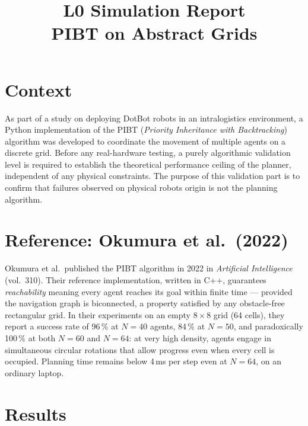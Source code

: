 \documentclass[12pt,a4paper]{article}
\title{\textbf{L0 Simulation Report}\\
\large PIBT on Abstract Grids}
\author{}
\date{}
\begin{document}
\maketitle

\section{Context}

As part of a study on deploying DotBot robots in an intralogistics environment,
a Python implementation of the PIBT (\textit{Priority Inheritance with Backtracking})
algorithm was developed to coordinate the movement of multiple agents on a discrete grid.
Before any real-hardware testing, a purely algorithmic validation level is required to establish the theoretical performance ceiling of the planner,
independent of any physical constraints. The purpose of this validation part is to confirm that
failures observed on physical robots origin is not the planning algorithm.

\section{Reference: Okumura et al.\ (2022)}

Okumura et al.\ published the PIBT algorithm in 2022 in \textit{Artificial Intelligence}
(vol.\ 310). Their reference implementation, written in C++, guarantees
\textit{reachability} meaning every agent reaches its goal within finite time ---
provided the navigation graph is biconnected, a property satisfied by any obstacle-free
rectangular grid. In their experiments on an empty $8\times8$ grid (64 cells), they report
a success rate of 96\,\% at $N=40$ agents, 84\,\% at $N=50$, and paradoxically 100\,\% at
both $N=60$ and $N=64$: at very high density, agents engage in simultaneous circular
rotations that allow progress even when every cell is occupied. Planning time remains
below 4\,ms per step even at $N=64$, on an ordinary laptop.

\section{Results}
\end{document}
